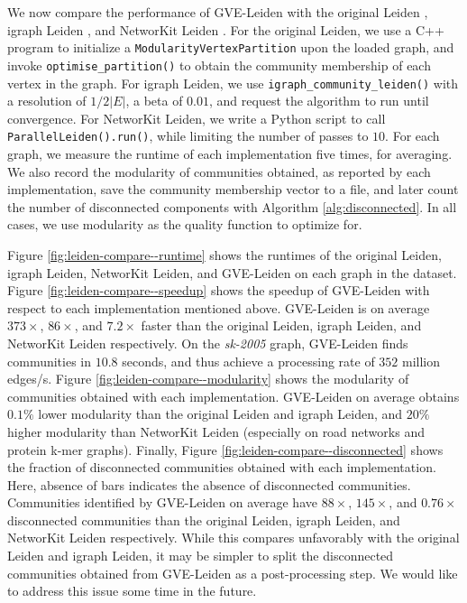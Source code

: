We now compare the performance of GVE-Leiden with the original Leiden \cite{com-traag19}, igraph Leiden \cite{csardi2006igraph}, and NetworKit Leiden \cite{staudt2016networkit}. For the original Leiden, we use a C++ program to initialize a \texttt{ModularityVertexPartition} upon the loaded graph, and invoke \texttt{optimise\_partition()} to obtain the community membership of each vertex in the graph. For igraph Leiden, we use \texttt{igraph\_community\_leiden()} with a resolution of $1/2|E|$, a beta of $0.01$, and request the algorithm to run until convergence. For NetworKit Leiden, we write a Python script to call \texttt{ParallelLeiden().run()}, while limiting the number of passes to $10$. For each graph, we measure the runtime of each implementation five times, for averaging. We also record the modularity of communities obtained, as reported by each implementation, save the community membership vector to a file, and later count the number of disconnected components with Algorithm \ref{alg:disconnected}. In all cases, we use modularity as the quality function to optimize for.

Figure \ref{fig:leiden-compare--runtime} shows the runtimes of the original Leiden, igraph Leiden, NetworKit Leiden, and GVE-Leiden on each graph in the dataset. Figure \ref{fig:leiden-compare--speedup} shows the speedup of GVE-Leiden with respect to each implementation mentioned above. GVE-Leiden is on average $373\times$, $86\times$, and $7.2\times$ faster than the original Leiden, igraph Leiden, and NetworKit Leiden respectively. On the \textit{sk-2005} graph, GVE-Leiden finds communities in $10.8$ seconds, and thus achieve a processing rate of $352$ million edges/s. Figure \ref{fig:leiden-compare--modularity} shows the modularity of communities obtained with each implementation. GVE-Leiden on average obtains $0.1\%$ lower modularity than the original Leiden and igraph Leiden, and $20\%$ higher modularity than NetworKit Leiden (especially on road networks and protein k-mer graphs). Finally, Figure \ref{fig:leiden-compare--disconnected} shows the fraction of disconnected communities obtained with each implementation. Here, absence of bars indicates the absence of disconnected communities. Communities identified by GVE-Leiden on average have $88\times$, $145\times$, and $0.76\times$ disconnected communities than the original Leiden, igraph Leiden, and NetworKit Leiden respectively. While this compares unfavorably with the original Leiden and igraph Leiden, it may be simpler to split the disconnected communities obtained from GVE-Leiden as a post-processing step. We would like to address this issue some time in the future.

